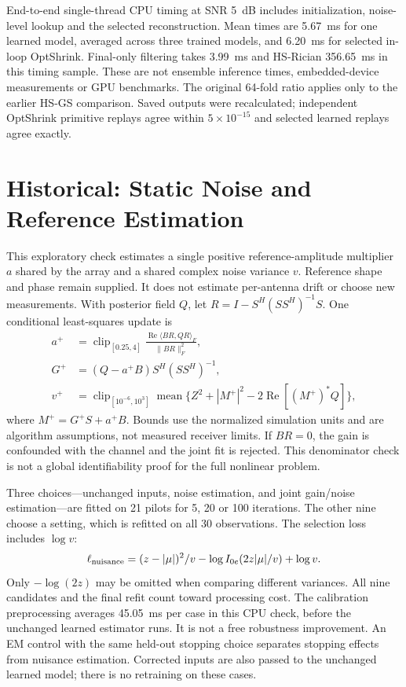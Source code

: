 End-to-end single-thread CPU timing at SNR 5~dB includes initialization,
noise-level lookup and the selected reconstruction. Mean times are 5.67~ms
for one learned model, averaged across three trained models, and 6.20~ms
for selected in-loop OptShrink. Final-only filtering takes 3.99~ms and
HS-Rician 356.65~ms in this timing sample. These are not ensemble inference
times, embedded-device measurements or GPU benchmarks. The original
64-fold ratio applies only to the earlier HS-GS comparison. Saved outputs
were recalculated; independent OptShrink primitive replays agree within
$5\times10^{-15}$ and selected learned replays agree exactly.

\section{Historical: Static Noise and Reference Estimation}
This exploratory check estimates a single positive reference-amplitude
multiplier $a$ shared by the array and a shared complex noise variance
$v$. Reference shape and phase remain supplied. It does not estimate
per-antenna drift or choose new measurements. With posterior field $Q$,
let $R=I-S^H(SS^H)^{-1}S$. One conditional least-squares update is
\begin{align}
 a^+&=\operatorname{clip}_{[0.25,4]}
       \frac{\operatorname{Re}\langle BR,QR\rangle_F}{\|BR\|_F^2},\\
 G^+&=(Q-a^+B)S^H(SS^H)^{-1},\\
 v^+&=\operatorname{clip}_{[10^{-6},10^3]}
       \operatorname{mean}\{Z^2+|M^+|^2-2\operatorname{Re}[(M^+)^*Q]\},
\end{align}
where $M^+=G^+S+a^+B$. Bounds use the normalized simulation units and
are algorithm assumptions, not measured receiver limits. If $BR=0$,
the gain is confounded with the channel and the joint fit is rejected.
This denominator check is not a global identifiability proof for the
full nonlinear problem.

Three choices---unchanged inputs, noise estimation, and joint gain/noise
estimation---are fitted on 21 pilots for 5, 20 or 100 iterations.
The other nine choose a setting, which is refitted on all 30 observations.
The selection loss includes $\log v$:
\begin{equation}
 \ell_{\rm nuisance}=(z-|\mu|)^2/v-\log I_{0e}(2z|\mu|/v)+\log v.
\end{equation}
Only $-\log(2z)$ may be omitted when comparing different variances.
All nine candidates and the final refit count toward processing cost.
The calibration preprocessing averages 45.05~ms per case in this CPU
check, before the unchanged learned estimator runs. It is not a free
robustness improvement.
An EM control with the same held-out stopping choice separates stopping
effects from nuisance estimation. Corrected inputs are also passed to
the unchanged learned model; there is no retraining on these cases.

